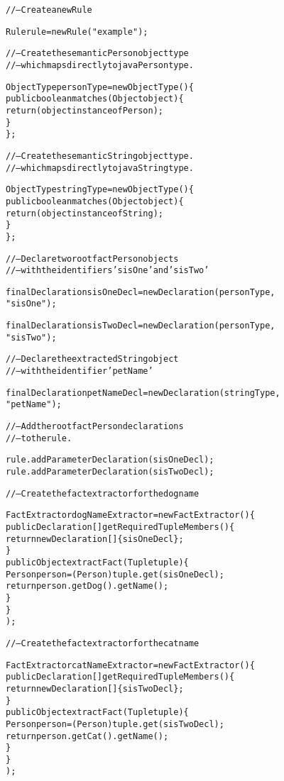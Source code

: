 \footnotesize
\begin{alltt}
// -- Create a new Rule

Rule rule = new Rule("example");

// -- Create the semantic Person object type
// -- which maps directly to java Person type.

ObjectType personType = new ObjectType() \{
        public boolean matches(Object object) \{ 
            return ( object instanceof Person );
        \}
    \};

// -- Create the semantic String object type.
// -- which maps directly to java String type.

ObjectType stringType = new ObjectType() \{
        public boolean matches(Object object) \{ 
            return ( object instanceof String );
        \}
    \};

// -- Declare two root fact Person objects 
// -- with the identifiers 'sisOne' and 'sisTwo'

final Declaration sisOneDecl = new Declaration( personType,
                                                "sisOne" );

final Declaration sisTwoDecl = new Declaration( personType,
                                                "sisTwo" );

// -- Declare the extracted String object
// -- with the identifier 'petName'

final Declaration petNameDecl = new Declaration( stringType,
                                                 "petName" );

// -- Add the root fact Person declarations
// -- to the rule.

rule.addParameterDeclaration( sisOneDecl );
rule.addParameterDeclaration( sisTwoDecl );

\newpage

// -- Create the fact extractor for the dog name

FactExtractor dogNameExtractor = new FactExtractor() \{
        public Declaration[] getRequiredTupleMembers() \{
            return new Declaration[] \{ sisOneDecl \};
        \}
        public Object extractFact(Tuple tuple) \{
            Person person = (Person) tuple.get( sisOneDecl );
            return person.getDog().getName();
        \}
    \}
      );

// -- Create the fact extractor for the cat name

FactExtractor catNameExtractor = new FactExtractor() \{
        public Declaration[] getRequiredTupleMembers() \{
            return new Declaration[] \{ sisTwoDecl \};
        \}
        public Object extractFact(Tuple tuple) \{
            Person person = (Person) tuple.get( sisTwoDecl );
            return person.getCat().getName();
        \}
    \}
      );


\end{alltt}
